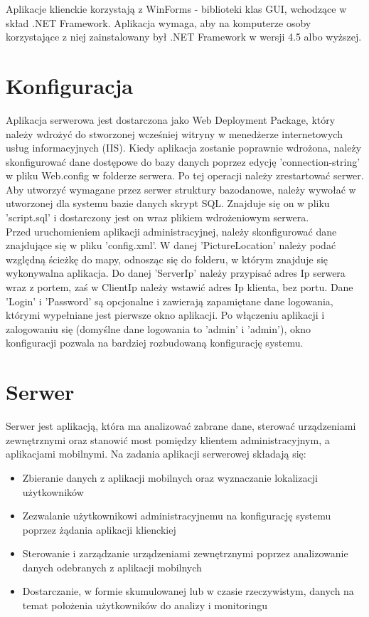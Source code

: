 Aplikacje klienckie korzystają z WinForms - biblioteki klas GUI, wchodzące w skład .NET Framework. Aplikacja wymaga, aby na komputerze osoby korzystające z niej zainstalowany był .NET Framework w wersji 4.5 albo wyższej.
\section{Konfiguracja}
Aplikacja serwerowa jest dostarczona jako Web Deployment Package, który należy wdrożyć do stworzonej wcześniej witryny w menedżerze internetowych usług informacyjnych (IIS). Kiedy aplikacja zostanie poprawnie wdrożona, należy skonfigurować dane dostępowe do bazy danych poprzez edycję 'connection-string' w pliku Web.config w folderze serwera. Po tej operacji należy zrestartować serwer.\\
Aby utworzyć wymagane przez serwer struktury bazodanowe, należy wywołać w utworzonej dla systemu bazie danych skrypt SQL. Znajduje się on w pliku 'script.sql' i dostarczony jest on wraz plikiem wdrożeniowym serwera.\\
Przed uruchomieniem aplikacji administracyjnej, należy skonfigurować dane znajdujące się w pliku 'config.xml'. W danej 'PictureLocation' należy podać względną ścieżkę do mapy, odnosząc się do folderu, w którym znajduje się wykonywalna aplikacja. Do danej 'ServerIp' należy przypisać adres Ip serwera wraz z portem, zaś w ClientIp należy wstawić adres Ip klienta, bez portu. Dane 'Login' i 'Password' są opcjonalne i zawierają zapamiętane dane logowania, którymi wypełniane jest pierwsze okno aplikacji. Po włączeniu aplikacji i zalogowaniu się (domyślne dane logowania to 'admin' i 'admin'), okno konfiguracji pozwala na bardziej rozbudowaną konfigurację systemu.
\section{Serwer}
Serwer jest aplikacją, która ma analizować zabrane dane, sterować urządzeniami zewnętrznymi oraz stanowić most pomiędzy klientem administracyjnym, a aplikacjami mobilnymi. Na zadania aplikacji serwerowej składają się:
\begin{itemize}
	\item Zbieranie danych z aplikacji mobilnych oraz wyznaczanie lokalizacji użytkowników
	\item Zezwalanie użytkownikowi administracyjnemu na konfigurację systemu poprzez żądania aplikacji klienckiej
	\item Sterowanie i zarządzanie urządzeniami zewnętrznymi poprzez analizowanie danych odebranych z aplikacji mobilnych
	\item Dostarczanie, w formie skumulowanej lub w czasie rzeczywistym, danych na temat położenia użytkowników do analizy i monitoringu
\end{itemize}
